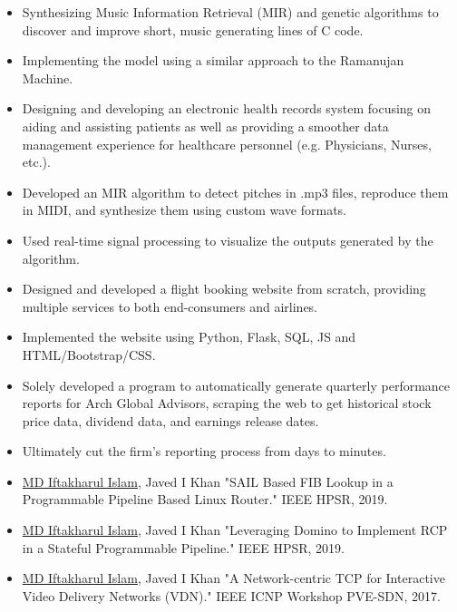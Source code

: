 \begin{itemize}
\item Synthesizing Music Information Retrieval (MIR) and genetic algorithms to discover and improve short, music generating lines of C code.
\item Implementing the model using a similar approach to the Ramanujan Machine.
\end{itemize}
\smallskip
{}
\begin{itemize}
\item Designing and developing an electronic health records system focusing on aiding and assisting patients as well as providing a smoother data management experience for healthcare personnel (e.g. Physicians, Nurses, etc.).
\end{itemize}
\smallskip
{}
\begin{itemize}
\item Developed an MIR algorithm to detect pitches in .mp3 files, reproduce them in MIDI, and synthesize them using custom wave formats.
\item Used real-time signal processing to visualize the outputs generated by the algorithm.
\end{itemize}
\smallskip
{}
\begin{itemize}
\item Designed and developed a flight booking website from scratch, providing multiple services to both end-consumers and airlines.
\item Implemented the website using Python, Flask, SQL, JS and HTML/Bootstrap/CSS.
\end{itemize}
\smallskip
{}
\begin{itemize}
\item Solely developed a program to automatically generate quarterly performance reports for Arch Global Advisors, scraping the web to get historical stock price data, dividend data, and earnings release dates.
\item Ultimately cut the firm's reporting process from days to minutes.
\end{itemize}

\begin{itemize}
   \item \underline{MD Iftakharul Islam}, Javed I Khan "SAIL Based FIB Lookup in a Programmable Pipeline Based Linux Router." IEEE HPSR, 2019.
\item \underline{MD Iftakharul Islam}, Javed I Khan "Leveraging Domino to Implement RCP in a Stateful Programmable Pipeline." IEEE HPSR, 2019.
\item \underline{MD Iftakharul Islam}, Javed I Khan "A Network-centric TCP for Interactive Video Delivery Networks (VDN)." IEEE ICNP Workshop PVE-SDN, 2017.

\end{itemize}

\cvproject{}